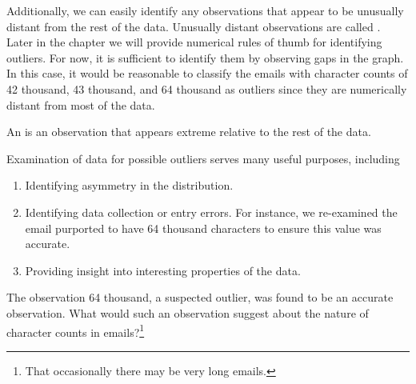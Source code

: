 
Additionally, we can easily identify any observations that appear to be unusually distant from the rest of the data. Unusually distant observations are called .  Later in the chapter we will provide numerical rules of thumb for identifying outliers.  For now, it is sufficient to identify them by observing gaps in the graph.  In this case, it would be reasonable to classify the emails with character counts of 42 thousand, 43 thousand, and 64 thousand as outliers since they are numerically distant from most of the data.


\begin{termBox}{
An  is an observation that appears extreme relative to the rest of the data.}
\end{termBox}


\begin{tipBox}{
Examination of data for possible outliers serves many useful purposes, including\vspace{-2mm}
\begin{enumerate}
\setlength{\itemsep}{0mm}
\item Identifying asymmetry in the distribution. 
\item Identifying data collection or entry errors. For instance, we re-examined the email purported to have 64 thousand characters to ensure this value was accurate.
\item Providing insight into interesting properties of the data.\vspace{0.5mm}
\end{enumerate}}
\end{tipBox}

\begin{exercise}
The observation 64 thousand, a suspected outlier, was found to be an accurate observation. What would such an observation suggest about the nature of character counts in emails?\footnote{That occasionally there may be very long emails.}\end{exercise}


